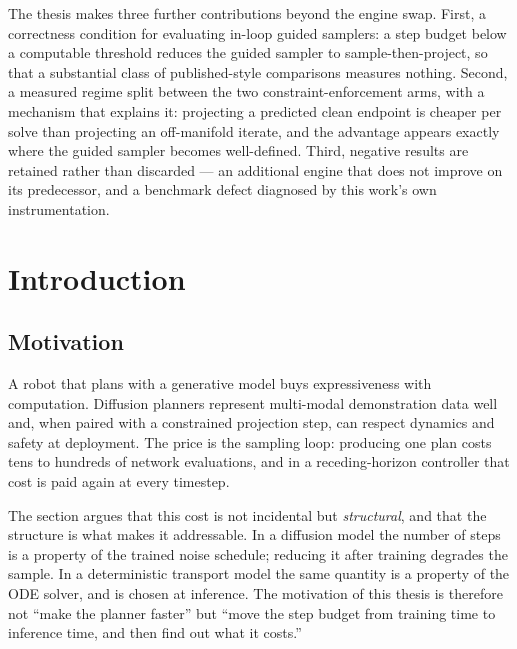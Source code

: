 \documentclass[headsepline,footsepline,footinclude=false,oneside,fontsize=11pt,paper=a4,listof=totoc,bibliography=totoc]{scrbook}
\begin{document}
The thesis makes three further contributions beyond the engine swap. First, a
correctness condition for evaluating in-loop guided samplers: a step budget below a
computable threshold reduces the guided sampler to sample-then-project, so that a
substantial class of published-style comparisons measures nothing. Second, a measured
regime split between the two constraint-enforcement arms, with a mechanism that explains
it: projecting a predicted clean endpoint is cheaper per solve than projecting an
off-manifold iterate, and the advantage appears exactly where the guided sampler becomes
well-defined. Third, negative results are retained rather than discarded --- an
additional engine that does not improve on its predecessor, and a benchmark defect
diagnosed by this work's own instrumentation.
\fi

\tableofcontents{}

\mainmatter{}

\chapter{Introduction}\label{ch:introduction}

\section{Motivation}\label{sec:intro:motivation}

A robot that plans with a generative model buys expressiveness with computation. Diffusion
planners represent multi-modal demonstration data well and, when paired with a constrained
projection step, can respect dynamics and safety at deployment. The price is the sampling
loop: producing one plan costs tens to hundreds of network evaluations, and in a
receding-horizon controller that cost is paid again at every timestep.

The section argues that this cost is not incidental but \emph{structural}, and that the
structure is what makes it addressable. In a diffusion model the number of steps is a
property of the trained noise schedule; reducing it after training degrades the sample.
In a deterministic transport model the same quantity is a property of the ODE solver, and
is chosen at inference. The motivation of this thesis is therefore not ``make the planner
faster'' but ``move the step budget from training time to inference time, and then find out
what it costs.''
\end{document}
